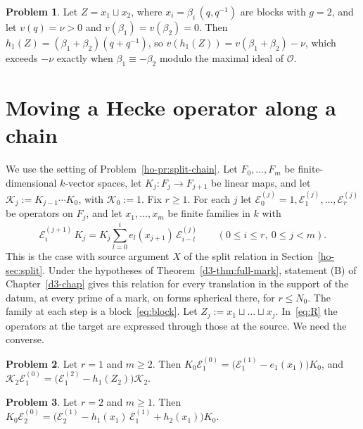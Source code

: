 \documentclass[reqno]{amsart}
\newcounter{chap}
\theoremstyle{definition}
\newtheorem{problem}{Problem}[section]
\theoremstyle{plain}
\theoremstyle{remark}
\newcommand{\Oc}{\mathcal{O}}
\newcommand{\Ec}{\mathcal{E}}
\newcommand{\Kc}{\mathcal{K}}
\begin{document}
\begin{problem}\label{pr:two-blocks}
Let \(Z = x_1 \sqcup x_2\), where \(x_i = \beta_i\,(q, q^{-1})\) are blocks with \(g = 2\), and let \(v(q) = \nu > 0\) and \(v(\beta_1) = v(\beta_2) = 0\).  Then \(h_1(Z) = (\beta_1 + \beta_2)(q + q^{-1})\), so \(v(h_1(Z)) = v(\beta_1 + \beta_2) - \nu\), which exceeds \(-\nu\) exactly when \(\beta_1 \equiv -\beta_2\) modulo the maximal ideal of \(\Oc\).
\end{problem}

\section{Moving a Hecke operator along a chain}\label{sec:move}

We use the setting of Problem~\ref{ho-pr:split-chain}.  Let \(F_0, \dots, F_m\) be finite-dimensional \(k\)-vector spaces, let \(K_j \colon F_j \to F_{j+1}\) be linear maps, and let \(\Kc_j := K_{j-1} \cdots K_0\), with \(\Kc_0 := 1\).  Fix \(r \ge 1\).  For each \(j\) let \(\Ec^{(j)}_0 = 1, \Ec^{(j)}_1, \dots, \Ec^{(j)}_r\) be operators on \(F_j\), and let \(x_1, \dots, x_m\) be finite families in \(k\) with
\begin{equation}\label{eq:R}
  \Ec^{(j+1)}_i\, K_j = K_j \sum_{l=0}^i e_l(x_{j+1})\, \Ec^{(j)}_{i-l} \qquad (0 \le i \le r,\ 0 \le j < m) .
\end{equation}
This is the case with source argument \(X\) of the split relation in Section~\ref{ho-sec:split}.  Under the hypotheses of Theorem~\ref{d3-thm:full-mark}, statement (B) of Chapter~\ref{d3-chap} gives this relation for every translation in the support of the datum, at every prime of a mark, on forms spherical there, for \(r \le N_0\).  The family at each step is a block~\eqref{eq:block}.  Let \(Z_j := x_1 \sqcup \dots \sqcup x_j\).  In~\eqref{eq:R} the operators at the target are expressed through those at the source.  We need the converse.

\begin{problem}\label{pr:r-one}
Let \(r = 1\) and \(m \ge 2\).  Then \(K_0 \Ec^{(0)}_1 = \bigl(\Ec^{(1)}_1 - e_1(x_1)\bigr) K_0\), and \(\Kc_2 \Ec^{(0)}_1 = \bigl(\Ec^{(2)}_1 - h_1(Z_2)\bigr) \Kc_2\).
\end{problem}

\begin{problem}\label{pr:r-two}
Let \(r = 2\) and \(m \ge 1\).  Then \(K_0 \Ec^{(0)}_2 = \bigl(\Ec^{(1)}_2 - h_1(x_1)\, \Ec^{(1)}_1 + h_2(x_1)\bigr) K_0\).
\end{problem}
\end{document}

